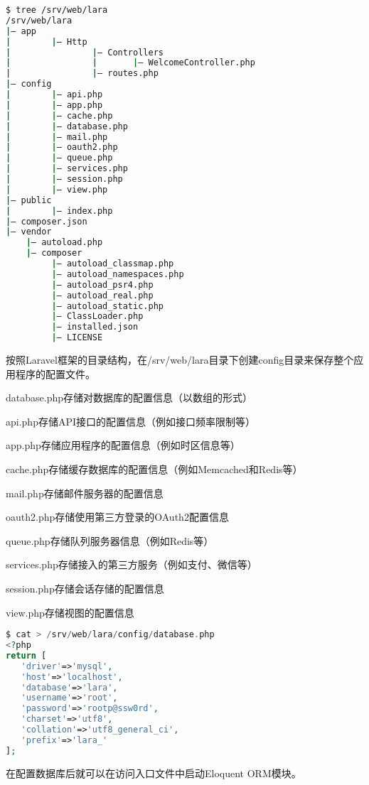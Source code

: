 \begin{lstlisting}[language=bash]
$ tree /srv/web/lara
/srv/web/lara
|— app
|        |— Http
|                |— Controllers
|                |       |— WelcomeController.php 
|                |— routes.php
|— config
|        |— api.php
|        |— app.php
|        |— cache.php
|        |— database.php
|        |— mail.php
|        |— oauth2.php
|        |— queue.php
|        |— services.php
|        |— session.php
|        |— view.php
|— public
|        |— index.php
|— composer.json
|— vendor
    |— autoload.php
    |— composer
         |— autoload_classmap.php
         |— autoload_namespaces.php
         |— autoload_psr4.php
         |— autoload_real.php
         |— autoload_static.php
         |— ClassLoader.php
         |— installed.json
         |— LICENSE
\end{lstlisting}

按照Laravel框架的目录结构，在/srv/web/lara目录下创建config目录来保存整个应用程序的配置文件。

\begin{compactitem}
\item database.php存储对数据库的配置信息（以数组的形式）
\item api.php存储API接口的配置信息（例如接口频率限制等）
\item app.php存储应用程序的配置信息（例如时区信息等）
\item cache.php存储缓存数据库的配置信息（例如Memcached和Redis等）
\item mail.php存储邮件服务器的配置信息
\item oauth2.php存储使用第三方登录的OAuth2配置信息
\item queue.php存储队列服务器信息（例如Redis等）
\item services.php存储接入的第三方服务（例如支付、微信等）
\item session.php存储会话存储的配置信息
\item view.php存储视图的配置信息
\end{compactitem}

\begin{lstlisting}[language=PHP]
$ cat > /srv/web/lara/config/database.php
<?php
return [
   'driver'=>'mysql',
   'host'=>'localhost',
   'database'=>'lara',
   'username'=>'root',
   'password'=>'rootp@ssw0rd',
   'charset'=>'utf8',
   'collation'=>'utf8_general_ci',
   'prefix'=>'lara_'
];
\end{lstlisting}


在配置数据库后就可以在访问入口文件中启动Eloquent ORM模块。


